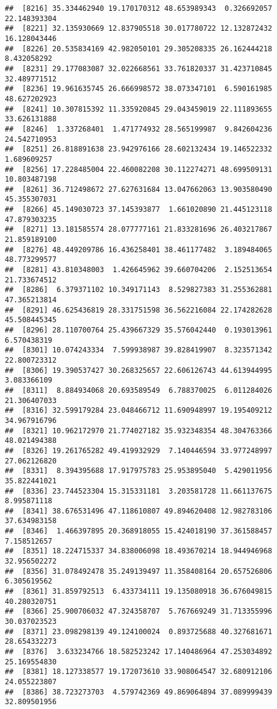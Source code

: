 \documentclass[
]{article}
\begin{document}
\begin{verbatim}
##  [8216] 35.334462940 19.170170312 48.653989343  0.326692057 22.148393304
##  [8221] 32.135930669 12.837905518 30.017780722 12.132872432 16.128043446
##  [8226] 20.535834169 42.982050101 29.305208335 26.162444218  8.432058292
##  [8231] 29.177083087 32.022668561 33.761820337 31.423710845 32.489771512
##  [8236] 19.961635745 26.666998572 38.073347101  6.590161985 48.627202923
##  [8241] 10.307815392 11.335920845 29.043459019 22.111893655 33.626131888
##  [8246]  1.337268401  1.471774932 28.565199987  9.842604236 24.542710953
##  [8251] 26.818891638 23.942976166 28.602132434 19.146522332  1.689609257
##  [8256] 17.228485004 22.460082208 30.112274271 48.699509131 10.803487198
##  [8261] 36.712498672 27.627631684 13.047662063 13.903580490 45.355307031
##  [8266] 45.149030723 37.145393877  1.661020890 21.445123118 47.879303235
##  [8271] 13.181585574 28.077777161 21.833281696 26.403217867 21.859189100
##  [8276] 48.449209786 16.436258401 38.461177482  3.189484065 48.773299577
##  [8281] 43.810348003  1.426645962 39.660704206  2.152513654 21.733674512
##  [8286]  6.379371102 10.349171143  8.529827383 31.255362881 47.365213814
##  [8291] 46.625436819 28.331751598 36.562216084 22.174282628 45.508445345
##  [8296] 28.110700764 25.439667329 35.576042440  0.193013961  6.570438319
##  [8301] 10.074243334  7.599938987 39.828419907  8.323571342 22.800723312
##  [8306] 19.390537427 30.268325657 22.606126743 44.613944995  3.083366109
##  [8311]  8.884934068 20.693589549  6.788370025  6.011284026 21.306407033
##  [8316] 32.599179284 23.048466712 11.690948997 19.195409212 34.967916796
##  [8321] 10.962172970 21.774027182 35.932348354 48.304763366 48.021494388
##  [8326] 19.261765282 49.419932929  7.140446594 33.977248997 27.062126820
##  [8331]  8.394395688 17.917975783 25.953895040  5.429011956 35.822441021
##  [8336] 23.744523304 15.315331181  3.203581728 11.661137675  8.995871118
##  [8341] 38.676531496 47.118610807 49.894620408 12.982783106 37.634983158
##  [8346]  1.466397895 20.368918055 15.424018190 37.361588457  7.158512657
##  [8351] 18.224715337 34.838006098 18.493670214 18.944946968 32.956502272
##  [8356] 31.078492478 35.249139497 11.358408164 20.657526806  6.305619562
##  [8361] 31.859792513  6.433734111 19.135080918 36.676049815 40.280320751
##  [8366] 25.900706032 47.324358707  5.767669249 31.713355996 30.037023523
##  [8371] 23.098298139 49.124100024  0.893725688 40.327681671 28.654332273
##  [8376]  3.633234766 18.582523242 17.140486964 47.253034892 25.169554830
##  [8381] 18.127338577 19.172073610 33.908064547 32.680912106 24.055223807
##  [8386] 38.723273703  4.579742369 49.869064894 37.089999439 32.809501956

\end{verbatim}
\end{document}
